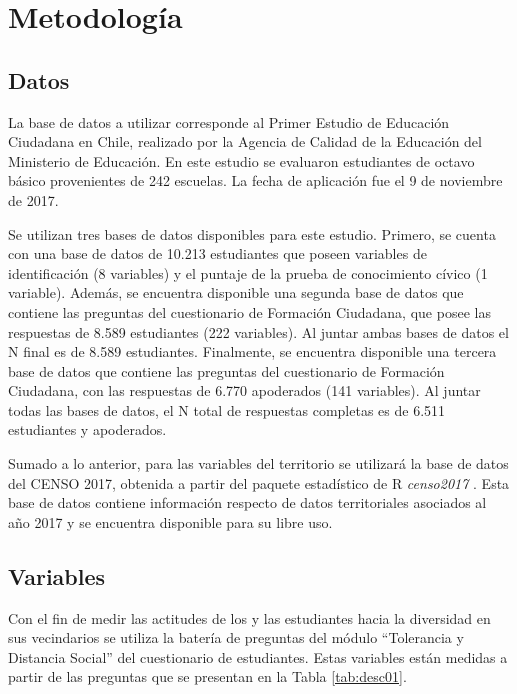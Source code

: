 \documentclass[12pt,twoside]{templates/facsothesis}
\begin{document}
\hypertarget{metodologuxeda}{%
\chapter{Metodología}\label{metodologuxeda}}

\hypertarget{datos}{%
\section{Datos}\label{datos}}

La base de datos a utilizar corresponde al Primer Estudio de Educación Ciudadana en Chile, realizado por la Agencia de Calidad de la Educación del Ministerio de Educación. En este estudio se evaluaron estudiantes de octavo básico provenientes de 242 escuelas. La fecha de aplicación fue el 9 de noviembre de 2017.

Se utilizan tres bases de datos disponibles para este estudio. Primero, se cuenta con una base de datos de 10.213 estudiantes que poseen variables de identificación (8 variables) y el puntaje de la prueba de conocimiento cívico (1 variable). Además, se encuentra disponible una segunda base de datos que contiene las preguntas del cuestionario de Formación Ciudadana, que posee las respuestas de 8.589 estudiantes (222 variables). Al juntar ambas bases de datos el N final es de 8.589 estudiantes. Finalmente, se encuentra disponible una tercera base de datos que contiene las preguntas del cuestionario de Formación Ciudadana, con las respuestas de 6.770 apoderados (141 variables). Al juntar todas las bases de datos, el N total de respuestas completas es de 6.511 estudiantes y apoderados.

Sumado a lo anterior, para las variables del territorio se utilizará la base de datos del CENSO 2017, obtenida a partir del paquete estadístico de R \emph{censo2017} \citep{vargas_censo2017_2022}. Esta base de datos contiene información respecto de datos territoriales asociados al año 2017 y se encuentra disponible para su libre uso.

\hypertarget{variables}{%
\section{Variables}\label{variables}}

Con el fin de medir las actitudes de los y las estudiantes hacia la diversidad en sus vecindarios se utiliza la batería de preguntas del módulo ``Tolerancia y Distancia Social'' del cuestionario de estudiantes. Estas variables están medidas a partir de las preguntas que se presentan en la Tabla \ref{tab:desc01}.
\end{document}
